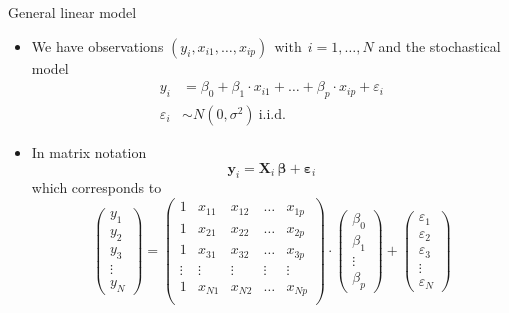 \documentclass{beamer}
\newcommand{\vect}[1]{\mathbf{#1}}
\newcommand{\mat}[1]{\mathbf{#1}}
\newcommand{\gvect}[1]{\boldsymbol{#1}}
\begin{document}
\begin{frame}{General linear model}
  \begin{itemize}
    \item We have observations $(y_i, x_{i1}, \ldots, x_{ip}) ~~\text{with}~~ i = 1, \ldots, N$
and the stochastical model
\begin{align*}
  y_i & = \beta_0 + \beta_1 \cdot x_{i1} + \ldots + \beta_p \cdot x_{ip} +
        \varepsilon_i \\
  \varepsilon_i & \sim N (0, \sigma^2)~\text{i.i.d.}
\end{align*}

\vspace{-.4cm}
\item In matrix notation
\[
  \vect{y}_i = \mat{X}_i \, \gvect{\beta} + \gvect{\varepsilon}_i
\]
which corresponds to
\[
  \begin{pmatrix}
    y_1 \\
    y_2 \\
    y_3 \\
    \vdots \\
    y_N
  \end{pmatrix} = 
  \begin{pmatrix}
    1 & x_{11} & x_{12} & \dots & x_{1p} \\
    1 & x_{21} & x_{22} & \dots & x_{2p} \\
    1 & x_{31} & x_{32} & \dots & x_{3p} \\
    \vdots & \vdots & \vdots & \vdots & \vdots \\
    1 & x_{N1} & x_{N2} & \dots & x_{Np} \\
  \end{pmatrix} \cdot
  \begin{pmatrix}
    \beta_0 \\
    \beta_1 \\
    \vdots \\
    \beta_p
  \end{pmatrix} +
  \begin{pmatrix}
    \varepsilon_1 \\
    \varepsilon_2 \\
    \varepsilon_3 \\
    \vdots \\
    \varepsilon_N
  \end{pmatrix}
\]
  \end{itemize}
\end{frame}
\end{document}
